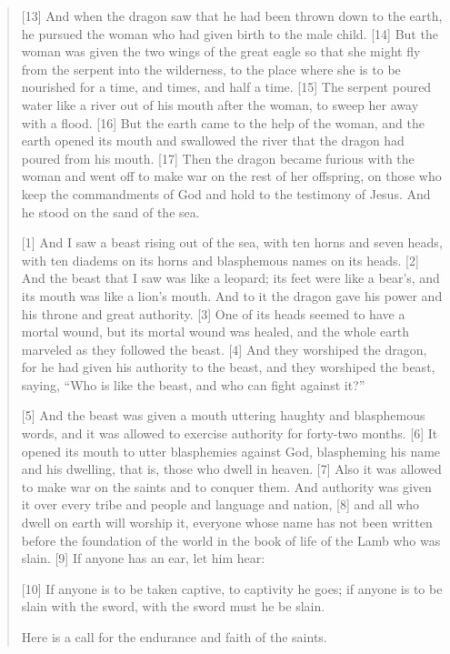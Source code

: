 \begin{quote}
    [13] And when the dragon saw that he had been thrown down to the earth,
    he pursued the woman who had given birth to the male child.  [14] But the
    woman was given the two wings of the great eagle so that she might fly
    from the serpent into the wilderness, to the place where she is to be
    nourished for a time, and times, and half a time.  [15] The serpent
    poured water like a river out of his mouth after the woman, to sweep her
    away with a flood.  [16] But the earth came to the help of the woman, and
    the earth opened its mouth and swallowed the river that the dragon had
    poured from his mouth.  [17] Then the dragon became furious with the
    woman and went off to make war on the rest of her offspring, on those who
    keep the commandments of God and hold to the testimony of Jesus.  And he
    stood on the sand of the sea.

    [1] And I saw a beast rising out of the sea, with ten horns and seven
    heads, with ten diadems on its horns and blasphemous names on its heads.
    [2] And the beast that I saw was like a leopard; its feet were like a
    bear’s, and its mouth was like a lion’s mouth.  And to it the dragon gave
    his power and his throne and great authority.  [3] One of its heads
    seemed to have a mortal wound, but its mortal wound was healed, and the
    whole earth marveled as they followed the beast.  [4] And they worshiped
    the dragon, for he had given his authority to the beast, and they
    worshiped the beast, saying, “Who is like the beast, and who can fight
    against it?”

    [5] And the beast was given a mouth uttering haughty and blasphemous
    words, and it was allowed to exercise authority for forty-two months.
    [6] It opened its mouth to utter blasphemies against God, blaspheming his
    name and his dwelling, that is, those who dwell in heaven.  [7] Also it
    was allowed to make war on the saints and to conquer them.  And authority
    was given it over every tribe and people and language and nation, [8] and
    all who dwell on earth will worship it, everyone whose name has not been
    written before the foundation of the world in the book of life of the
    Lamb who was slain.  [9] If anyone has an ear, let him hear:

    [10] If anyone is to be taken captive,
        to captivity he goes;
    if anyone is to be slain with the sword,
        with the sword must he be slain.

    Here is a call for the endurance and faith of the saints.


\end{quote}
